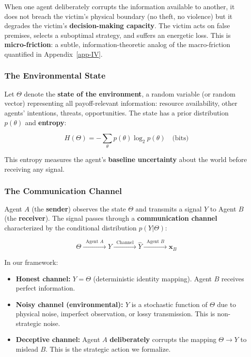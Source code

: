 \documentclass[11pt]{article}
\theoremstyle{plain}
\theoremstyle{definition}
\theoremstyle{remark}
\let\origsubsubsection\subsubsection
\renewcommand{\subsubsection}{\needspace{4\baselineskip}\origsubsubsection}
\providecommand{\tightlist}{%
  \setlength{\itemsep}{0pt}\setlength{\parskip}{0pt}}
\begin{document}
When one agent deliberately corrupts the information available to
another, it does not breach the victim's physical boundary (no theft, no
violence) but it degrades the victim's \textbf{decision-making
capacity}. The victim acts on false premises, selects a suboptimal
strategy, and suffers an energetic loss. This is
\textbf{micro-friction}: a subtle, information-theoretic analog of the
macro-friction quantified in Appendix~\ref{app-IV}.

\subsubsection{The Environmental State}\label{the-environmental-state}

Let \(\Theta\) denote the \textbf{state of the environment}, a random
variable (or random vector) representing all payoff-relevant
information: resource availability, other agents' intentions, threats,
opportunities. The state has a prior distribution \(p(\theta)\) and
\textbf{entropy}:

\[H(\Theta) = -\sum_{\theta} p(\theta) \log_2 p(\theta) \quad \text{(bits)}\]

This entropy measures the agent's \textbf{baseline uncertainty} about
the world before receiving any signal.

\subsubsection{The Communication
Channel}\label{the-communication-channel}

Agent \(A\) (the \textbf{sender}) observes the state \(\Theta\) and
transmits a signal \(Y\) to Agent \(B\) (the \textbf{receiver}). The
signal passes through a \textbf{communication channel} characterized by
the conditional distribution \(p(Y | \Theta)\):

\[\Theta \xrightarrow{\;\;\text{Agent } A\;\;} Y \xrightarrow{\;\;\text{Channel}\;\;} \hat{Y} \xrightarrow{\;\;\text{Agent } B\;\;} \mathbf{x}_B\]

In our framework:

\begin{itemize}
\tightlist
\item
  \textbf{Honest channel:} \(Y = \Theta\) (deterministic identity
  mapping). Agent \(B\) receives perfect information.
\item
  \textbf{Noisy channel (environmental):} \(Y\) is a stochastic function
  of \(\Theta\) due to physical noise, imperfect observation, or lossy
  transmission. This is non-strategic noise.
\item
  \textbf{Deceptive channel:} Agent \(A\) \textbf{deliberately} corrupts
  the mapping \(\Theta \to Y\) to mislead \(B\). This is the strategic
  action we formalize.
\end{itemize}
\end{document}
